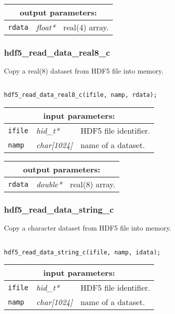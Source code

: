 \vskip 0.8cm

\noindent
\begin{tabular}{|p{1.5cm}|p{2cm}|p{11cm}|}
\hline
\multicolumn{3}{|c|}{\bf output parameters:} \\
\hline
{\tt rdata} & {\it float*} & real(4) array. \\
\hline
\end{tabular}

\subsubsection{hdf5\_read\_data\_real8\_c}

Copy a real(8) dataset from HDF5 file into memory.

\begin{verbatim}

hdf5_read_data_real8_c(ifile, namp, rdata);
\end{verbatim}

\noindent
\begin{tabular}{|p{1.5cm}|p{2cm}|p{11cm}|}
\hline
\multicolumn{3}{|c|}{\bf input parameters:} \\
\hline
{\tt ifile} & {\it hid\_t*} & HDF5 file identifier. \\
\hline
{\tt namp} & {\it char[1024]} & name of a dataset. \\
\hline
\end{tabular}

\vskip 0.8cm

\noindent
\begin{tabular}{|p{1.5cm}|p{2cm}|p{11cm}|}
\hline
\multicolumn{3}{|c|}{\bf output parameters:} \\
\hline
{\tt rdata} & {\it double*} & real(8) array. \\
\hline
\end{tabular}

\subsubsection{hdf5\_read\_data\_string\_c}

Copy a character dataset from HDF5 file into memory.

\begin{verbatim}

hdf5_read_data_string_c(ifile, namp, idata);
\end{verbatim}

\noindent
\begin{tabular}{|p{1.5cm}|p{2cm}|p{11cm}|}
\hline
\multicolumn{3}{|c|}{\bf input parameters:} \\
\hline
{\tt ifile} & {\it hid\_t*} & HDF5 file identifier. \\
\hline
{\tt namp} & {\it char[1024]} & name of a dataset. \\
\hline
\end{tabular}

